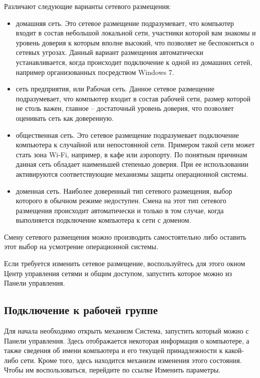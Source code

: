 Различают следующие варианты сетевого размещения:
\begin{itemize}
\item домашняя сеть. Это сетевое размещение подразумевает, что компьютер входит в состав небольшой локальной сети, участники которой вам знакомы и уровень доверия к которым вполне высокий, что позволяет не беспокоиться о сетевых угрозах. Данный вариант размещения автоматически устанавливается, когда происходит подключение к одной из домашних сетей, например организованных посредством Windows 7.
\item сеть предприятия, или Рабочая сеть. Данное сетевое размещение подразумевает, что компьютер входит в состав рабочей сети, размер которой не столь важен, главное – достаточный уровень доверия, что позволяет оценивать сеть как доверенную.
\item общественная сеть. Это сетевое размещение подразумевает подключение компьютера к случайной или непостоянной сети. Примером такой сети может стать зона Wi-Fi, например, в кафе или аэропорту. По понятным причинам данная сеть обладает наименьшей степенью доверия. При ее использовании активируются соответствующие механизмы защиты операционной системы.
\item доменная сеть. Наиболее доверенный тип сетевого размещения, выбор которого в обычном режиме недоступен. Смена на этот тип сетевого размещения происходит автоматически и только в том случае, когда выполняется подключение компьютера к сети с доменом.
\end{itemize}

Смену сетевого размещения можно производить самостоятельно либо оставить этот выбор на усмотрение операционной системы.\par\bigskip

Если требуется изменить сетевое размещение, воспользуйтесь для этого окном Центр управления сетями и общим доступом, запустить которое можно из Панели управления.

\subsection{Подключение к рабочей группе}

Для начала необходимо открыть механизм Система, запустить который можно с Панели управления. Здесь отображается некоторая информация о компьютере, а также сведения об имени компьютера и его текущей принадлежности к какой-либо сети. Кроме того, здесь находится механизм изменения этого состояния. Чтобы им воспользоваться, перейдите по ссылке Изменить параметры.\par\bigskip

